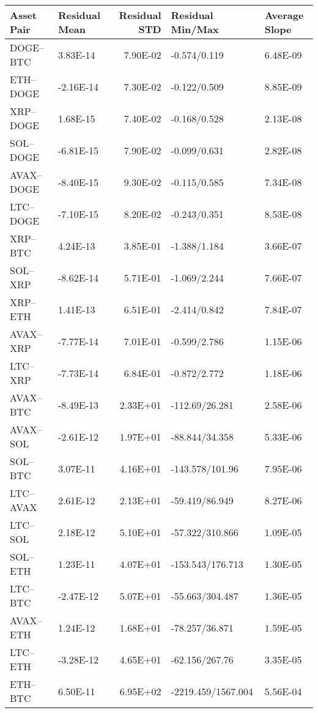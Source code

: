 \begin{tabular}{llrll}
\toprule
Asset Pair & Residual Mean & Residual STD & Residual Min/Max & Average Slope \\
\midrule
DOGE–BTC & 3.83E-14 & 7.90E-02 & -0.574/0.119 & 6.48E-09 \\
ETH–DOGE & -2.16E-14 & 7.30E-02 & -0.122/0.509 & 8.85E-09 \\
XRP–DOGE & 1.68E-15 & 7.40E-02 & -0.168/0.528 & 2.13E-08 \\
SOL–DOGE & -6.81E-15 & 7.90E-02 & -0.099/0.631 & 2.82E-08 \\
AVAX–DOGE & -8.40E-15 & 9.30E-02 & -0.115/0.585 & 7.34E-08 \\
LTC–DOGE & -7.10E-15 & 8.20E-02 & -0.243/0.351 & 8.53E-08 \\
XRP–BTC & 4.24E-13 & 3.85E-01 & -1.388/1.184 & 3.66E-07 \\
SOL–XRP & -8.62E-14 & 5.71E-01 & -1.069/2.244 & 7.66E-07 \\
XRP–ETH & 1.41E-13 & 6.51E-01 & -2.414/0.842 & 7.84E-07 \\
AVAX–XRP & -7.77E-14 & 7.01E-01 & -0.599/2.786 & 1.15E-06 \\
LTC–XRP & -7.73E-14 & 6.84E-01 & -0.872/2.772 & 1.18E-06 \\
AVAX–BTC & -8.49E-13 & 2.33E+01 & -112.69/26.281 & 2.58E-06 \\
AVAX–SOL & -2.61E-12 & 1.97E+01 & -88.844/34.358 & 5.33E-06 \\
SOL–BTC & 3.07E-11 & 4.16E+01 & -143.578/101.96 & 7.95E-06 \\
LTC–AVAX & 2.61E-12 & 2.13E+01 & -59.419/86.949 & 8.27E-06 \\
LTC–SOL & 2.18E-12 & 5.10E+01 & -57.322/310.866 & 1.09E-05 \\
SOL–ETH & 1.23E-11 & 4.07E+01 & -153.543/176.713 & 1.30E-05 \\
LTC–BTC & -2.47E-12 & 5.07E+01 & -55.663/304.487 & 1.36E-05 \\
AVAX–ETH & 1.24E-12 & 1.68E+01 & -78.257/36.871 & 1.59E-05 \\
LTC–ETH & -3.28E-12 & 4.65E+01 & -62.156/267.76 & 3.35E-05 \\
ETH–BTC & 6.50E-11 & 6.95E+02 & -2219.459/1567.004 & 5.56E-04 \\
\bottomrule
\end{tabular}
